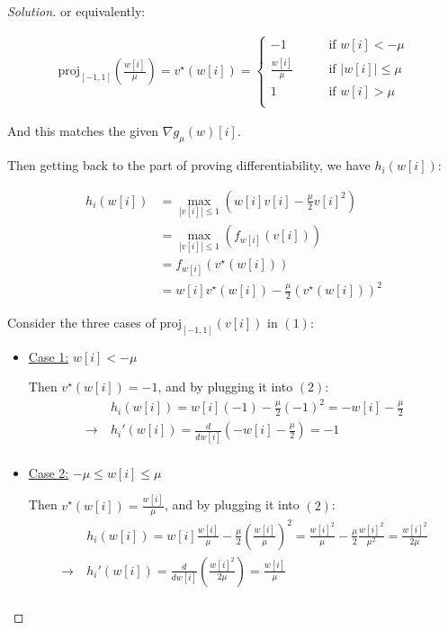 \documentclass{article}
\newenvironment{solution}
  {\renewcommand\qedsymbol{$\blacksquare$}\begin{proof}[Solution]}
  {\end{proof}}
\begin{document}
\begin{solution}
    or equivalently:

    \begin{align*}
        \text{proj}_{[-1, 1]}\left( \frac{w[i]}{\mu} \right) 
        = v^\star(w[i])
        = \begin{cases}
            -1 \qquad &\text{if } w[i] < - \mu \\
            \frac{w[i]}{\mu} \qquad &\text{if } \vert w[i]\vert \leq \mu \\
            1 \qquad &\text{if } w[i] > \mu \\
        \end{cases} \tag{1}
    \end{align*}

    And this matches the given $\nabla g_\mu(w)[i]$.
    \bigskip

    Then getting back to the part of proving differentiability, we have $h_i(w[i])$:

    \begin{align*}
        h_i(w[i]) 
        &= \max_{|v[i]| \leq 1} \left( w[i] v[i] - \frac{\mu}{2} v[i]^2 \right) \\
        &= \max_{|v[i]| \leq 1} \left(f_{w[i]}(v[i])\right) \\
        &= f_{w[i]}(v^\star(w[i])) \\
        &= w[i] v^\star (w[i]) - \frac{\mu}{2} (v^\star (w[i]))^2 \tag{2}
    \end{align*}

    Consider the three cases of $\text{proj}_{[-1, 1]}(v[i])$ in $(1)$:
    \bigskip

    \begin{itemize}
        \item \underline{Case 1:} $w[i] < - \mu$
        \bigskip

        Then $v^\star(w[i]) = -1$, and by plugging it into $(2)$:
        \begin{align*}
            &h_i(w[i]) = w[i] (-1) - \frac{\mu}{2} (-1)^2 = - w[i] - \frac{\mu}{2} \\
            \rightarrow \ & h_i'(w[i]) = \frac{d}{dw[i]} \left( - w[i] - \frac{\mu}{2} \right) = -1 \\
        \end{align*}

        \item \underline{Case 2:} $- \mu \leq w[i] \leq \mu$
        \bigskip

        Then $v^\star(w[i]) = \frac{w[i]}{\mu}$, and by plugging it into $(2)$:
        \begin{align*}
            &h_i(w[i]) = w[i] \frac{w[i]}{\mu} - \frac{\mu}{2} \left( \frac{w[i]}{\mu} \right)^2 = \frac{w[i]^2}{\mu} - \frac{\mu}{2} \frac{w[i]^2}{\mu^2} = \frac{w[i]^2}{2\mu} \\
            \rightarrow \ & h_i'(w[i]) = \frac{d}{dw[i]} \left( \frac{w[i]^2}{2\mu} \right) = \frac{w[i]}{\mu} \\
        \end{align*}


\end{itemize}
\end{solution}
\end{document}
